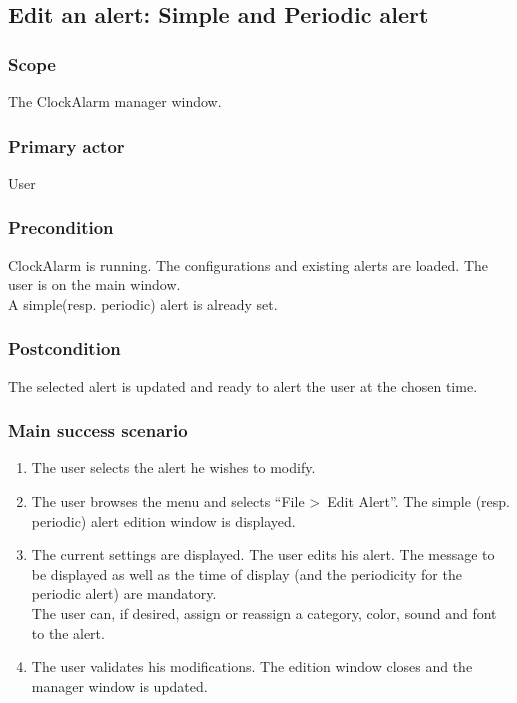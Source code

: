 \subsection{Edit an alert: Simple and Periodic alert}

\subsubsection{Scope}
The ClockAlarm manager window.
\subsubsection{Primary actor}
User
\subsubsection{Precondition}
ClockAlarm is running. The configurations and existing alerts are loaded. The user is on the main window.
\\A simple(resp. periodic) alert is already set.
\subsubsection{Postcondition}
The selected alert is updated and ready to alert the user at the chosen time.
\subsubsection{Main success scenario}
\begin{enumerate}
	\item The user selects the alert he wishes to modify.
	\item \label{itm:ucae_edit_spa} The user browses the menu and selects ``File \textgreater~Edit Alert''. The simple (resp. periodic) alert edition window is displayed. 
	\item \label{itm:ucae_enter_spa} The current settings are displayed. The user edits his alert. The message to be displayed as well as the time of display (and the periodicity for the periodic alert) are mandatory. \\The user can, if desired, assign or reassign a category, color, sound and font to the alert.
	\item \label{itm:ucae_validate_spa} The user validates his modifications. The edition window closes and the manager window is updated.
\end{enumerate}
